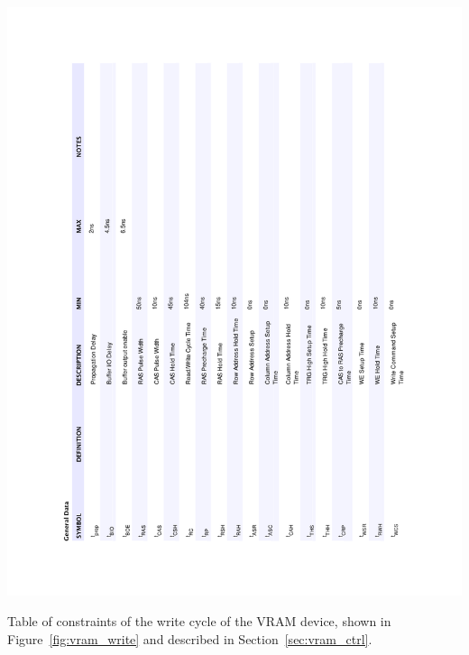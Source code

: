 \documentclass[titlepage]{scrartcl}
\begin{document}
	\begin{table}[h!]
	\vspace{-2cm}
	\centerline{\includegraphics[width=20cm]{img/vram_write_table.pdf}}
		\vspace{0cm}
                	\caption{Table of constraints of the write cycle of the VRAM device, shown in Figure~\ref{fig:vram_write} and described in Section~\ref{sec:vram_ctrl}.}
               	\label{tab:vram_write}
	\end{table}

	\clearpage

	

	\clearpage
\end{document}
